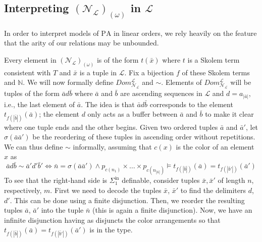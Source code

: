 \documentclass[11pt]{amsart}
\newcommand{\impmark}[1]{\strut\vadjust{\domark{\textcolor{#1}{$\blacktriangleright\blacktriangleright\blacktriangleright$}}}}
\newcommand{\domark}[1]{%
  \vbox to 0pt{
    \kern-\dp\strutbox
    \hbox{\smash{\llap{#1\kern1em}}}
    \vss
  }%
}
\newcommand{\comment}[1]{\impmark{blue}\ \textcolor{blue}{#1}}
\newcommand{\N}{\mathcal{N}}
\newcommand{\mc}[1]{\mathcal{#1}}
\newcommand{\Sinf}[1]{\Sigma^{\mathrm{in}}_{#1}}
\newcommand{\PA}{\mathrm{PA}}
\def\N{{\mathcal N}}
\theoremstyle{remark}
\begin{document}
\subsection{Interpreting $(\mc{N}_\mc{L})_{(\omega)}$ in $\mc{L}$}
In order to interpret models of $\PA$ in linear orders, we rely heavily on the feature that the arity of our relations may be unbounded.

Every element in $(\mc{N}_{\mc{L}})_{(\omega)}$ is of the form $t(\bar x)$ where $t$ is a Skolem term consistent with $T$ and $\bar x$ is a tuple in $\mc{L}$. Fix a bijection $f$ of these Skolem terms and $\mathbb N$. We will now formally define $Dom_{\N_\mc{L}}^\mc{L}$ and $\sim$.
Elements of $Dom_{\N_\mc{L}}^\mc{L}$ will be tuples of the form $\bar{a}d\bar{b}$ where $\bar a$ and $\bar b$ are ascending sequences in $\mathcal{L}$ and $d=a_{|\bar a|}$, i.e., the last element of $\bar a$. The idea is that $\bar{a}d\bar{b}$ corresponds to the element $t_{f(|\bar b|)}(\bar a)$; the element $d$ only acts as a buffer between $\bar{a}$ and $\bar{b}$ to make it clear where one tuple ends and the other begins. Given two ordered tuples $\bar a$ and $\bar a'$, let $\sigma(\bar a\bar a')$ be the reordering of these tuples in ascending order without repetitions. We can thus define $\sim$ informally, assuming that $c(x)$ is the color of an element $x$ as
\[\bar{a}d\bar{b}\sim \bar{a}'d'\bar{b}' \iff \bar n=\sigma(\bar a\bar a') \land p_{c(n_1)}\times \dots \times p_{c(n_{|\bar{n}|})}\models t_{f(|\bar{b}|)}(\bar a)=t_{f(|\bar{b}'|)}(\bar a')\]
To see that the right-hand side is $\Sinf{1}$ definable, consider tuples $\bar x, \bar x'$ of length $n$, respectively, $m$. First we need to decode the tuples $\bar x$, $\bar x'$ to find the delimiters $d$, $d'$. This can be done using a finite disjunction. Then, we reorder the resulting tuples $\bar a$, $\bar a'$ into the tuple $\bar n$ (this is again a finite disjunction). Now, we have an infinite disjunction having as disjuncts the color arrangements so that $t_{f(|\bar b|)}(\bar a)=t_{f(|\bar b'|)}(\bar a')$ is in the type.
\end{document}
